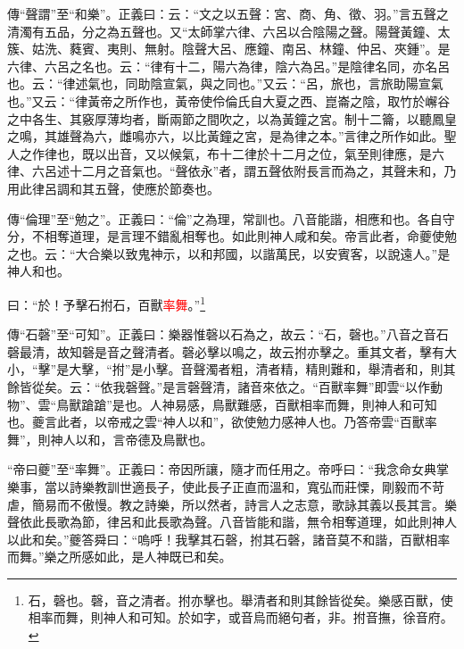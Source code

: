 {\noindent\zhuan{}\fzbyks 傳“聲謂”至“和樂”。正義曰：云：“文之以五聲：宮、商、角、徵、羽。”言五聲之清濁有五品，分之為五聲也。又“太師掌六律、六呂以合陰陽之聲。陽聲黃鐘、太簇、姑洗、蕤賓、夷則、無射。陰聲大呂、應鐘、南呂、林鐘、仲呂、夾鍾”。是六律、六呂之名也。云：“律有十二，陽六為律，陰六為呂。”是陰律名同，亦名呂也。云：“律述氣也，同助陰宣氣，與之同也。”又云：“呂，旅也，言旅助陽宣氣也。”又云：“律黃帝之所作也，黃帝使伶倫氏自大夏之西、崑崙之陰，取竹於嶰谷之中各生、其竅厚薄均者，斷兩節之間吹之，以為黃鐘之宮。制十二籥，以聽鳳皇之鳴，其雄聲為六，雌鳴亦六，以比黃鐘之宮，是為律之本。”言律之所作如此。聖人之作律也，既以出音，又以候氣，布十二律於十二月之位，氣至則律應，是六律、六呂述十二月之音氣也。“聲依永”者，謂五聲依附長言而為之，其聲未和，乃用此律呂調和其五聲，使應於節奏也。 \par}

{\noindent\zhuan{}\fzbyks 傳“倫理”至“勉之”。正義曰：“倫”之為理，常訓也。八音能諧，相應和也。各自守分，不相奪道理，是言理不錯亂相奪也。如此則神人咸和矣。帝言此者，命夔使勉之也。云：“大合樂以致鬼神示，以和邦國，以諧萬民，以安賓客，以說遠人。”是神人和也。 \par}

曰：“於！予擊石拊石，百獸\textcolor{red}{率舞}。”\footnote{石，磬也。磬，音之清者。拊亦擊也。舉清者和則其餘皆從矣。樂感百獸，使相率而舞，則神人和可知。於如字，或音烏而絕句者，非。拊音撫，徐音府。}

{\noindent\zhuan{}\fzbyks 傳“石磬”至“可知”。正義曰：樂器惟磬以石為之，故云：“石，磬也。”八音之音石磬最清，故知磬是音之聲清者。磬必擊以鳴之，故云拊亦擊之。重其文者，擊有大小，“擊”是大擊，“拊”是小擊。音聲濁者粗，清者精，精則難和，舉清者和，則其餘皆從矣。云：“依我磬聲。”是言磬聲清，諸音來依之。“百獸率舞”即雲“以作動物”、雲“鳥獸蹌蹌”是也。人神易感，鳥獸難感，百獸相率而舞，則神人和可知也。夔言此者，以帝戒之雲“神人以和”，欲使勉力感神人也。乃答帝雲“百獸率舞”，則神人以和，言帝德及鳥獸也。 \par}

{\noindent\shu{}\fzkt “帝曰夔”至“率舞”。正義曰：帝因所讓，隨才而任用之。帝呼曰：“我念命女典掌樂事，當以詩樂教訓世適長子，使此長子正直而溫和，寬弘而莊慄，剛毅而不苛虐，簡易而不傲慢。教之詩樂，所以然者，詩言人之志意，歌詠其義以長其言。樂聲依此長歌為節，律呂和此長歌為聲。八音皆能和諧，無令相奪道理，如此則神人以此和矣。”夔答舜曰：“嗚呼！我擊其石磬，拊其石磬，諸音莫不和諧，百獸相率而舞。”樂之所感如此，是人神既已和矣。 \par}


